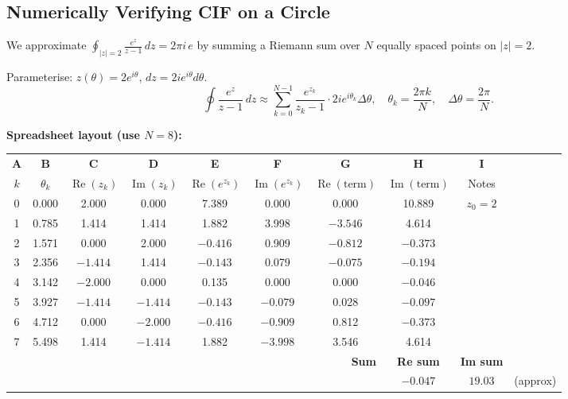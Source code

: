 \documentclass[12pt,a4paper]{article}
\begin{document}
\subsection*{Numerically Verifying CIF on a Circle}

We approximate $\displaystyle\oint_{|z|=2}\frac{e^z}{z-1}\,dz = 2\pi i\,e$
by summing a Riemann sum over $N$ equally spaced points on $|z| = 2$.

\medskip

Parameterise: $z(\theta) = 2e^{i\theta}$, $dz = 2ie^{i\theta}d\theta$.
\[
  \oint \frac{e^z}{z-1}\,dz \approx \sum_{k=0}^{N-1}
  \frac{e^{z_k}}{z_k - 1} \cdot 2ie^{i\theta_k}\Delta\theta,
  \quad \theta_k = \frac{2\pi k}{N},\quad \Delta\theta = \frac{2\pi}{N}.
\]

\textbf{Spreadsheet layout (use $N = 8$):}

\begin{center}
\begin{tabular}{ccccccccc}
\toprule
\textbf{A} & \textbf{B} & \textbf{C} & \textbf{D} & \textbf{E} & \textbf{F} & \textbf{G} & \textbf{H} & \textbf{I} \\
$k$ & $\theta_k$ & $\operatorname{Re}(z_k)$ & $\operatorname{Im}(z_k)$ & $\operatorname{Re}(e^{z_k})$ & $\operatorname{Im}(e^{z_k})$ & $\operatorname{Re}(\text{term})$ & $\operatorname{Im}(\text{term})$ & Notes \\
\midrule
0 & 0.000 & 2.000 & 0.000 & 7.389 & 0.000 & 0.000 & 10.889 & $z_0 = 2$ \\
1 & 0.785 & 1.414 & 1.414 & 1.882 & 3.998 & $-3.546$ & 4.614 & \\
2 & 1.571 & 0.000 & 2.000 & $-0.416$ & 0.909 & $-0.812$ & $-0.373$ & \\
3 & 2.356 & $-1.414$ & 1.414 & $-0.143$ & 0.079 & $-0.075$ & $-0.194$ & \\
4 & 3.142 & $-2.000$ & 0.000 & 0.135 & 0.000 & 0.000 & $-0.046$ & \\
5 & 3.927 & $-1.414$ & $-1.414$ & $-0.143$ & $-0.079$ & 0.028 & $-0.097$ & \\
6 & 4.712 & 0.000 & $-2.000$ & $-0.416$ & $-0.909$ & 0.812 & $-0.373$ & \\
7 & 5.498 & 1.414 & $-1.414$ & 1.882 & $-3.998$ & 3.546 & 4.614 & \\
\midrule
\multicolumn{7}{r}{\textbf{Sum}} & \textbf{Re sum} & \textbf{Im sum} \\
\multicolumn{7}{r}{} & $-0.047$ & $19.03$ & (approx) \\
\bottomrule
\end{tabular}
\end{center}
\end{document}
